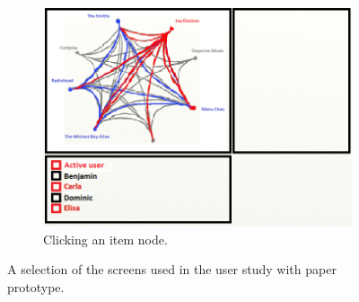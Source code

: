 \documentclass[a4paper,10pt,twocolumn]{article}
\begin{document}
\begin{appendices}
\begin{figure}
		~
		\begin{subfigure}[t]{0.3\textwidth}
						\centering
						\includegraphics[width=\textwidth]{img/paper_prototype_item_click}
						\caption{Clicking an item node.}
						\label{figure:paper_prototype_item_click}
		\end{subfigure}
		\caption{A selection of the screens used in the user study with paper prototype.}%
		\label{figure:paper_prototype}%
	\end{figure}


\end{appendices}
\end{document}
